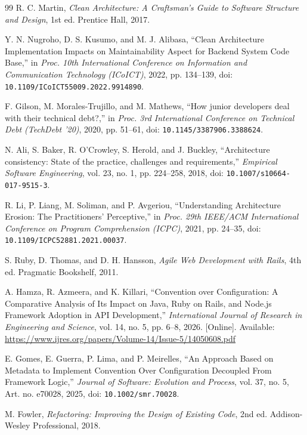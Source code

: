\documentclass[12pt,a4paper,oneside]{report}
\begin{document}
\begin{thebibliography}{99}
R. C. Martin, \textit{Clean Architecture: A Craftsman's Guide to Software Structure and Design}, 1st ed. Prentice Hall, 2017.

Y. N. Nugroho, D. S. Kusumo, and M. J. Alibasa, ``Clean Architecture Implementation Impacts on Maintainability Aspect for Backend System Code Base,'' in \textit{Proc. 10th International Conference on Information and Communication Technology (ICoICT)}, 2022, pp. 134--139, doi: \nolinkurl{10.1109/ICoICT55009.2022.9914890}.

F. Gilson, M. Morales-Trujillo, and M. Mathews, ``How junior developers deal with their technical debt?,'' in \textit{Proc. 3rd International Conference on Technical Debt (TechDebt '20)}, 2020, pp. 51--61, doi: \nolinkurl{10.1145/3387906.3388624}.

N. Ali, S. Baker, R. O'Crowley, S. Herold, and J. Buckley, ``Architecture consistency: State of the practice, challenges and requirements,'' \textit{Empirical Software Engineering}, vol. 23, no. 1, pp. 224--258, 2018, doi: \nolinkurl{10.1007/s10664-017-9515-3}.

R. Li, P. Liang, M. Soliman, and P. Avgeriou, ``Understanding Architecture Erosion: The Practitioners' Perceptive,'' in \textit{Proc. 29th IEEE/ACM International Conference on Program Comprehension (ICPC)}, 2021, pp. 24--35, doi: \nolinkurl{10.1109/ICPC52881.2021.00037}.

S. Ruby, D. Thomas, and D. H. Hansson, \textit{Agile Web Development with Rails}, 4th ed. Pragmatic Bookshelf, 2011.

A. Hamza, R. Azmeera, and K. Killari, ``Convention over Configuration: A Comparative Analysis of Its Impact on Java, Ruby on Rails, and Node.js Framework Adoption in API Development,'' \textit{International Journal of Research in Engineering and Science}, vol. 14, no. 5, pp. 6--8, 2026. [Online]. Available: \url{https://www.ijres.org/papers/Volume-14/Issue-5/14050608.pdf}

E. Gomes, E. Guerra, P. Lima, and P. Meirelles, ``An Approach Based on Metadata to Implement Convention Over Configuration Decoupled From Framework Logic,'' \textit{Journal of Software: Evolution and Process}, vol. 37, no. 5, Art. no. e70028, 2025, doi: \nolinkurl{10.1002/smr.70028}.

M. Fowler, \textit{Refactoring: Improving the Design of Existing Code}, 2nd ed. Addison-Wesley Professional, 2018.


\end{thebibliography}
\end{document}

